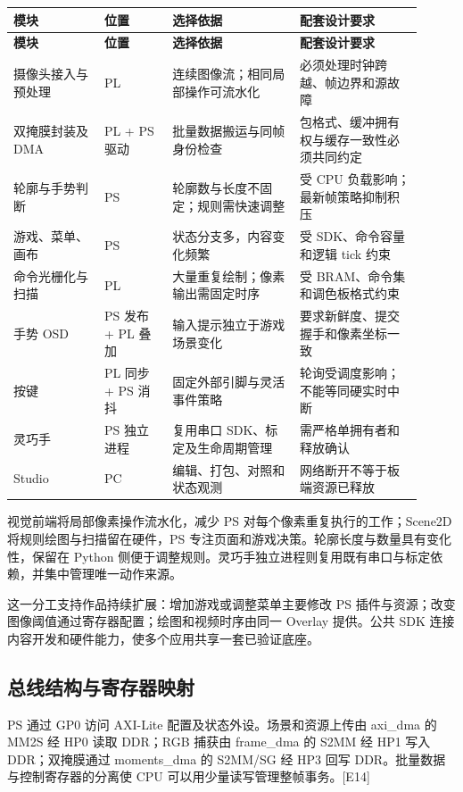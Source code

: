 {\small\renewcommand{\arraystretch}{1.28}
\begin{longtable}{@{}>{\raggedright\arraybackslash}p{0.2\linewidth}>{\raggedright\arraybackslash}p{0.15\linewidth}>{\raggedright\arraybackslash}p{0.29\linewidth}>{\raggedright\arraybackslash}p{0.27\linewidth}@{}}
\toprule
\bfseries 模块 & \bfseries 位置 & \bfseries 选择依据 & \bfseries 配套设计要求\\\midrule
\endfirsthead
\toprule
\bfseries 模块 & \bfseries 位置 & \bfseries 选择依据 & \bfseries 配套设计要求\\\midrule
\endhead
\bottomrule\endfoot
摄像头接入与预处理 & PL & 连续图像流；相同局部操作可流水化 & 必须处理时钟跨越、帧边界和源故障\\
双掩膜封装及 DMA & PL + PS 驱动 & 批量数据搬运与同帧身份检查 & 包格式、缓冲拥有权与缓存一致性必须共同约定\\
轮廓与手势判断 & PS & 轮廓数与长度不固定；规则需快速调整 & 受 CPU 负载影响；最新帧策略抑制积压\\
游戏、菜单、画布 & PS & 状态分支多，内容变化频繁 & 受 SDK、命令容量和逻辑 tick 约束\\
命令光栅化与扫描 & PL & 大量重复绘制；像素输出需固定时序 & 受 BRAM、命令集和调色板格式约束\\
手势 OSD & PS 发布 + PL 叠加 & 输入提示独立于游戏场景变化 & 要求新鲜度、提交握手和像素坐标一致\\
按键 & PL 同步 + PS 消抖 & 固定外部引脚与灵活事件策略 & 轮询受调度影响；不能等同硬实时中断\\
灵巧手 & PS 独立进程 & 复用串口 SDK、标定及生命周期管理 & 需严格单拥有者和释放确认\\
Studio & PC & 编辑、打包、对照和状态观测 & 网络断开不等于板端资源已释放\\
\end{longtable}}
视觉前端将局部像素操作流水化，减少 PS 对每个像素重复执行的工作；Scene2D 将规则绘图与扫描留在硬件，PS 专注页面和游戏决策。轮廓长度与数量具有变化性，保留在 Python 侧便于调整规则。灵巧手独立进程则复用既有串口与标定依赖，并集中管理唯一动作来源。

这一分工支持作品持续扩展：增加游戏或调整菜单主要修改 PS 插件与资源；改变图像阈值通过寄存器配置；绘图和视频时序由同一 Overlay 提供。公共 SDK 连接内容开发和硬件能力，使多个应用共享一套已验证底座。

\subsection{总线结构与寄存器映射}
PS 通过 GP0 访问 AXI-Lite 配置及状态外设。场景和资源上传由 axi\_dma 的 MM2S 经 HP0 读取 DDR；RGB 捕获由 frame\_dma 的 S2MM 经 HP1 写入 DDR；双掩膜通过 moments\_dma 的 S2MM/SG 经 HP3 回写 DDR。批量数据与控制寄存器的分离使 CPU 可以用少量读写管理整帧事务。[E14]

